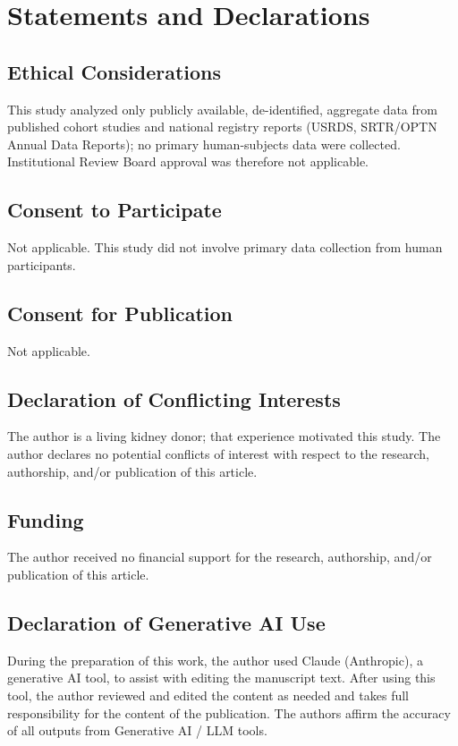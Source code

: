 \documentclass[11pt]{article}
\begin{document}
\section*{Statements and Declarations}
\textbf{\papertitle}

\subsection*{Ethical Considerations}
This study analyzed only publicly available, de-identified, aggregate data from published cohort studies and national registry reports (USRDS, SRTR/OPTN Annual Data Reports); no primary human-subjects data were collected. Institutional Review Board approval was therefore not applicable.

\subsection*{Consent to Participate}
Not applicable. This study did not involve primary data collection from human participants.

\subsection*{Consent for Publication}
Not applicable.

\subsection*{Declaration of Conflicting Interests}
The author is a living kidney donor; that experience motivated this study. The author declares no potential conflicts of interest with respect to the research, authorship, and/or publication of this article.

\subsection*{Funding}
The author received no financial support for the research, authorship, and/or publication of this article.

\subsection*{Declaration of Generative AI Use}
During the preparation of this work, the author used Claude (Anthropic), a generative AI tool, to assist with editing the manuscript text. After using this tool, the author reviewed and edited the content as needed and takes full responsibility for the content of the publication. The authors affirm the accuracy of all outputs from Generative AI / LLM tools.
\end{document}
